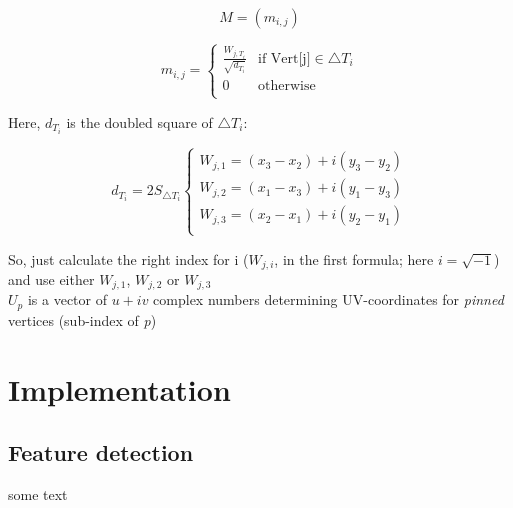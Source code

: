 \documentclass[12pt]{article}
\begin{document}
			\begin{displaymath}
				M = (m_{i,j})
			\end{displaymath}
			
			\begin{displaymath}
				m_{i,j} = 
				\begin{cases}
					\frac{W_{j, T_{i}}}{\sqrt{d_{T_{i}}}} & \text{if Vert[j]} \in \triangle T_{i} \\
					0 & \text{otherwise} \\
				\end{cases}
			\end{displaymath}
			
			Here, $d_{T_{i}}$ is the doubled square of $\triangle T_{i}$: 
			
			\begin{displaymath}
				d_{T_{i}} = 2S_{\triangle T_{i}}
				\begin{cases} 
					W_{j,1} = (x_{3} - x_{2}) + i(y_{3} - y_{2}) \\ 
					W_{j,2} = (x_{1} - x_{3}) + i(y_{1} - y_{3}) \\ 
					W_{j,3} = (x_{2} - x_{1}) + i(y_{2} - y_{1}) \\ 
				\end{cases}
			\end{displaymath}
			
			So, just calculate the right index for i ($W_{j,i}$, in the first formula; here $i = \sqrt{-1}$) and use either $W_{j,1}$, $W_{j,2}$ or $W_{j,3}$
			\\
			
			$U_{p}$ is a vector of $u + iv$ complex numbers determining UV-coordinates for \emph{pinned} vertices (sub-index of \emph{p})
			\\
	
	\pagebreak
			
	\section{Implementation}
		\subsection{Feature detection}
		
			some text
			
			
\end{document}
